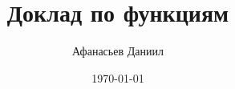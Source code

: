
\newcommand{\n}{\par}
\usepackage{ dsfont }
\pgfplotsset{width=13cm,compat=1.15}


	\title{Доклад по функциям}
	\author{Афанасьев Даниил}
	\date{\today}
	
	\maketitle
	
	\newpage
	
	\tableofcontents
	
	\newpage
	\centering
	
	
